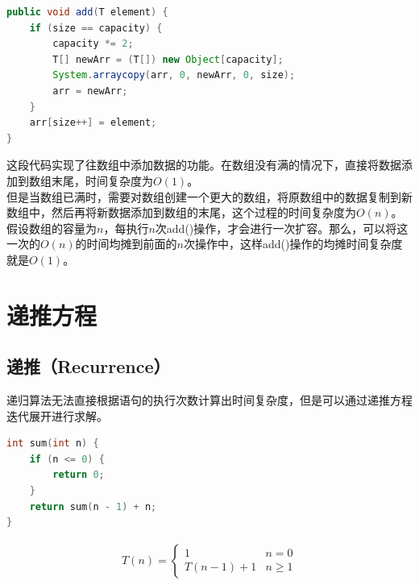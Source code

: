 
\begin{lstlisting}[language=Java]
public void add(T element) {
	if (size == capacity) {
		capacity *= 2;
		T[] newArr = (T[]) new Object[capacity];
		System.arraycopy(arr, 0, newArr, 0, size);
		arr = newArr;
	}
	arr[size++] = element;
}
\end{lstlisting}

这段代码实现了往数组中添加数据的功能。在数组没有满的情况下，直接将数据添加到数组末尾，时间复杂度为$ O(1) $。\\

但是当数组已满时，需要对数组创建一个更大的数组，将原数组中的数据复制到新数组中，然后再将新数据添加到数组的末尾，这个过程的时间复杂度为$ O(n) $。\\

假设数组的容量为$ n $，每执行$ n $次add()操作，才会进行一次扩容。那么，可以将这一次的$ O(n) $的时间均摊到前面的$ n $次操作中，这样add()操作的均摊时间复杂度就是$ O(1) $。

\newpage

\section{递推方程}

\subsection{递推（Recurrence）}

递归算法无法直接根据语句的执行次数计算出时间复杂度，但是可以通过递推方程迭代展开进行求解。\\


\begin{lstlisting}[language=C]
int sum(int n) {
	if (n <= 0) {
		return 0;
	}
	return sum(n - 1) + n;
}
\end{lstlisting}

\vspace{-0.5cm}

\begin{align}
	T(n) = \begin{cases}
		1          & n = 0   \\
		T(n-1) + 1 & n \ge 1
	\end{cases}
\end{align}

\vspace{-1cm}


